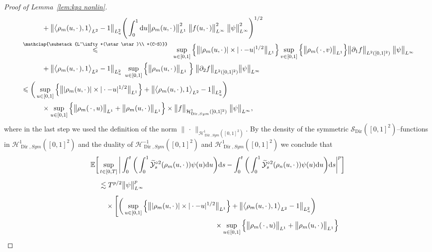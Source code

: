 \documentclass[AHL,Unicode,longabstracts]{cedram}
\DeclareMathOperator{\Dir}{Dir}
\newcommand{\mc}[1]{{\mathcal #1}}
\renewcommand{\mc}[1]{{\mathcal #1}}
\newcommand{\SD}{\ensuremath{\mc S_{\Dir}}}
\renewcommand{\leq}{\leqslant}
\newcommand*{\dd}{\mathrm{d}}
\newcommand*{\ds}{\dd s}
\newcommand*{\du}{\dd u}
\begin{document}
\begin{proof}[Proof of Lemma~\ref{lem:kpz nonlin}]
\begin{align*}
&\qquad \quad + \big\| \big\langle \rho_m (u, \cdot\,), 1 \big\rangle_{L^2} - 1 \big\|_{L^2_u} \Bigg(\int_0^1 \du\big\| \rho_m (u, \cdot\,) \big\|_{L^1}^2 \; \big\| f (u, \cdot\,)\big\|_{L^{\infty}}^2 \; \big\| \psi \big\|_{L^{\infty}}^2 \Bigg)^{1/2}\\
&\overset{\mathclap{\substack{L^\infty+(\star\star)\\ +(C-S)}}}{\leq}\;\; \sup_{u\in[0,1]} \Big\{ \big\| | \rho_m (u, \cdot\,) | \times | \cdot - u |^{1/2}\big\|_{L^1} \Big\} \sup_{v\in[0,1]} \Big\{\big\| \rho_m (\,\cdot\,, v) \big\|_{L^1} \Big\} \big\| \partial_1 f \big\|_{L^2([0,1]^2)}\; \big\| \psi \big\|_{L^{\infty}}\\*
&\qquad\quad+ \big\| \big\langle \rho_m (u, \cdot\,), 1 \big\rangle_{L^2} - 1 \big\|_{L^2_u} \; \sup_{u\in[0,1]} \Big\{ \big\|\rho_m (u, \cdot\,) \big\|_{L^1} \; \Big\}\; \big\| \partial_2 f \big\|_{L^2([0,1]^2)} \big\| \psi\big\|_{L^{\infty}}\\
&\leq \bigg(\sup_{u\in[0,1]} \Big\{ \big\| | \rho_m (u, \cdot\,) | \times | \cdot - u |^{1/2}\big\|_{L^1} \Big\} + \big\| \big\langle \rho_m (u, \cdot\,), 1 \big\rangle_{L^2} - 1 \big\|_{L^2_u} \bigg)\\*
&\qquad\quad\times \sup_{u\in[0,1]} \Big\{ \big\| \rho_m (\,\cdot\,, u) \big\|_{L^1} + \big\| \rho_m (u, \cdot\,)\big\|_{L^1} \Big\} \times \big\| f \big\|_{\mc H_{\Dir,Sym}^1([0, 1]^2)} \; \big\| \psi \big\|_{L^{\infty}},
\end{align*}
\endgroup
where in the last step we used the definition of the norm $\|{\,\cdot\,}\|_{\mc H_{\Dir,Sym}^1([0, 1]^2)}$. By the density of the symmetric $\SD ([0, 1]^2)$--functions in $\mc H_{\Dir, Sym}^1 ([0, 1]^2)$ and the duality of $\mc H_{\Dir, Sym}^{-1} ([0, 1]^2)$ and $\mc H_{\Dir, Sym}^1 ([0, 1]^2)$ we conclude that
\begin{align*}
\mathbb{E} \bigg[&\sup_{t \in[0,T]} \bigg| \int_0^t \bigg(\int_0^1\widetilde{\mc Y}^{\diamond 2}_s (\rho_m (u, \cdot\,)) \psi (u) \du \bigg) \ds - \int_0^t \bigg(\int_0^1 \widetilde{\mc Y}^{\diamond 2}_s (\rho_n (u, \cdot\,)) \psi (u) \du \bigg) \ds \bigg|^p \bigg]\\
&\lesssim T^{p / 2} \big\| \psi \big\|^p_{L^{\infty}} \vphantom{\int} \\
& \quad \times \Bigg[\bigg(\sup_{u\in[0,1]} \Big\{ \big\| | \rho_m (u, \cdot\,) | \times | \cdot - u |^{1/2}\big\|_{L^1} \Big\} + \big\| \big\langle \rho_m (u, \cdot\,), 1 \big\rangle_{L^2} - 1 \big\|_{L^2_u} \bigg)\\
&\mkern 300mu \times \sup_{u\in[0,1]} \Big\{ \big\| \rho_m (\,\cdot\,, u) \big\|_{L^1} + \big\| \rho_m (u, \cdot\,)\big\|_{L^1} \Big\}\\

\end{align*}
\end{proof}
\end{document}

